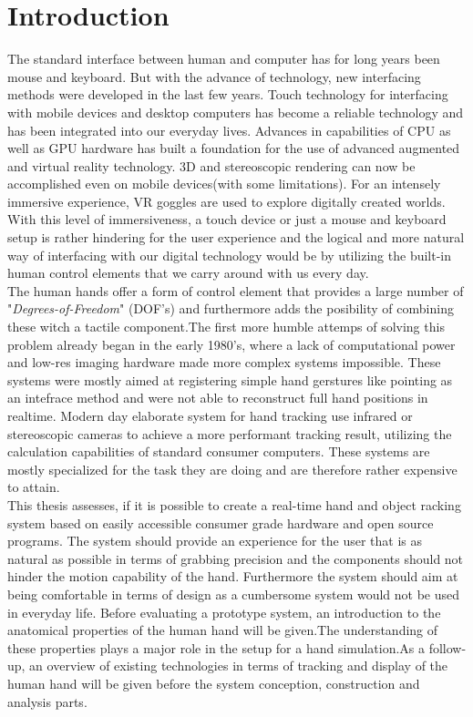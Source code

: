 \chapter{Introduction}
The standard interface between human and computer has for long years been mouse and keyboard. But with the advance of technology, new interfacing methods were developed in the last few years.
Touch technology for interfacing with mobile devices and desktop computers has become a reliable technology and has been integrated into our everyday lives.
Advances in capabilities of CPU as well as GPU hardware has built a foundation for the use of advanced augmented and virtual reality technology. 3D and stereoscopic rendering can now be accomplished even on mobile devices(with some limitations). For an intensely immersive experience, VR goggles are used to explore digitally created worlds.\\
With this level of immersiveness, a touch device or just a mouse and keyboard setup is rather hindering for the user experience and the logical and more natural way of interfacing with our digital technology would be by utilizing the built-in human control elements that we carry around with us every day.\\ The human hands offer a form of control element that provides a large number of "\textit{Degrees-of-Freedom}" (DOF's) and furthermore adds the posibility of combining these witch a tactile component.The first more humble attemps of solving this problem already began in the early 1980's, where a lack of computational power and low-res imaging hardware made more complex systems impossible. These systems were mostly aimed at registering simple hand gerstures like pointing as an intefrace method and were not able to reconstruct full hand positions in realtime\cite{Bolt.1980}. Modern day elaborate system for hand tracking use infrared or stereoscopic cameras to achieve a  more performant tracking result, utilizing the calculation capabilities of standard consumer computers. These systems are mostly specialized for the task they are doing and are therefore rather expensive to attain. \\
This thesis assesses, if it is possible to create a real-time hand and object racking system based on easily accessible consumer grade hardware and open source programs. The system should provide an experience for the user that is as natural as possible in terms of grabbing precision and the components should not hinder the motion capability of the hand. Furthermore the system should aim at being comfortable in terms of design as a cumbersome system would not be used  in everyday life.
Before evaluating a prototype system, an introduction to the anatomical properties of the human hand will be given.The understanding of these properties plays a major role in the setup for a hand simulation.As a follow-up, an overview of existing technologies in terms of tracking and display of the human hand will be given before the system conception, construction and analysis parts.


